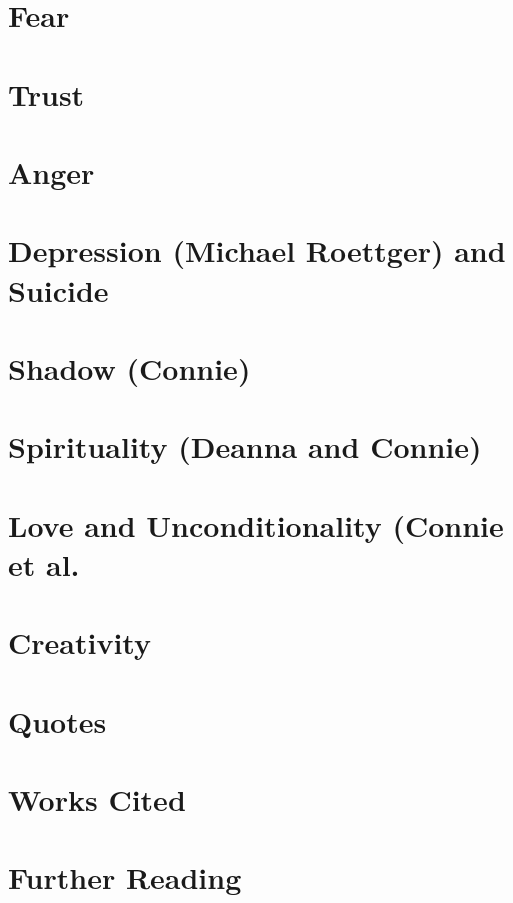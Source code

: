 \section{Fear}

\section{Trust}

\section{Anger}

\section{Depression (Michael Roettger) and Suicide}

\section{Shadow (Connie)}

\section{Spirituality (Deanna and Connie)}

\section{Love and Unconditionality (Connie et al.}

\section{Creativity}


\section{Quotes}

\section{Works Cited}

\section{Further Reading}




